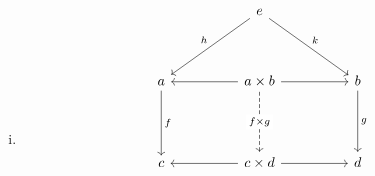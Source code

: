 \documentclass[12pt]{article}
\begin{document}
    \begin{exercise}
        \begin{enumerate}[(i)]
            \item 
            \[\begin{tikzcd}
                && {e} \\
                \\
                {a} && {a \times b} && {b} \\
                && {} \\
                {c} && {c \times d} && {d} \\
                \\
                \\
                \\
                && {}
                \arrow["{f}", from=3-1, to=5-1]
                \arrow["{g}", from=3-5, to=5-5]
                \arrow[from=3-3, to=3-1]
                \arrow[from=3-3, to=3-5]
                \arrow[from=5-3, to=5-1]
                \arrow[from=5-3, to=5-5]
                \arrow["{f\times g}" description, from=3-3, to=5-3, dashed]
                \arrow["{h}"', from=1-3, to=3-1]
                \arrow["{k}", from=1-3, to=3-5]
            \end{tikzcd}\]


\end{enumerate}
\end{exercise}
\end{document}
